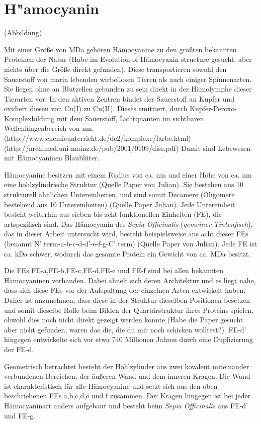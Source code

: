 \section{H"amocyanin}

(Abbildung)

Mit einer Größe von \unit[3-8]{MDa} gehören Hämocyanine zu den größten bekannten Proteinen der Natur (Habe im Evolution of Hämocyanin structure gesucht, aber nichts über die Größe direkt gefunden).
Diese transportieren sowohl den Sauerstoff von marin lebenden wirbellosen Tieren als auch einiger Spinnenarten.
Sie liegen ohne an Blutzellen gebunden zu sein direkt in der Hämolymphe dieser Tierarten vor.
In den aktiven Zentren bindet der Sauerstoff an Kupfer und oxidiert diesen von Cu(I) zu Cu(II).
Dieses emittiert, durch Kupfer-Peroxo-Komplexbildung mit dem Sauerstoff, Lichtquanten im sichtbaren Wellenlängenbereich von \unit[480-420]{nm}. (http://www.chemieunterricht.de/dc2/komplexe/farbe.html)(http://archimed.uni-mainz.de/pub/2001/0109/diss.pdf)
Damit sind Lebewesen mit Hämocyaninen Blaublüter.

Hämocyanine besitzen mit einem Radius von ca. \unit[35]{nm} und einer Höhe von ca. \unit[15]{nm} eine hohlzylindrische Struktur (Quelle Paper von Julian).
Sie bestehen aus 10 strukturell ähnlichen Untereinheiten, und sind somit Decamere (Oligomere bestehend aus 10 Untereinheiten) (Quelle Paper Julian). 
Jede Untereinheit besteht weiterhin aus sieben bis acht funktionellen Einheiten (FE), die artspezifisch sind.
Das Hämocyanin des \textit{Sepia Officinalis} (\textit{gemeiner Tintenfisch}), das in dieser Arbeit untersucht wird, besteht beispielsweise aus acht dieser FEs (benannt N' term-a-b-c-d-d'-e-f-g-C' term) (Quelle Paper von Julian).
Jede FE ist ca. \unit[50]{kDa} schwer, wodurch das gesamte Protein ein Gewicht von ca. \unit[4]{MDa} besitzt.

Die FEs FE-a,FE-b,FE-c,FE-d,FE-e und FE-f sind bei allen bekannten Hämocyaninen vorhanden.
Dabei ähnelt sich deren Architektur und es liegt nahe, dass sich diese FEs vor der Aufspaltung der einzelnen Arten entwickelt haben.
Daher ist anzunehmen, dass diese in der Struktur dieselben Positionen besetzen und somit dieselbe Rolle beim Bilden der Quartärstruktur ihres Proteins spielen, obwohl dies noch nicht direkt gezeigt werden konnte (Habe die Paper gesucht aber nicht gefunden, waren das die, die du mir noch schicken wolltest?).
FE-d' hingegen entwickelte sich vor etwa 740 Millionen Jahren durch eine Duplizierung der FE-d.

Geometrisch betrachtet besteht der Hohlzylinder aus zwei kovalent miteinander verbundenen Bereichen, der äußeren Wand und dem inneren Kragen.
Die Wand ist charakteristisch für alle Hämocyanine und setzt sich aus den oben beschriebenen FEs a,b,c,d,e und f zusammen.
Der Kragen hingegen ist bei jeder Hämocyaninart anders aufgebaut und besteht beim \textit{Sepia Officinalis} aus FE-d' und FE-g.

